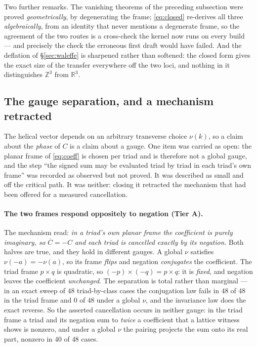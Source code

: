 \documentclass[11pt,a4paper]{article}
\newcommand{\tA}{\textcolor{TierA}{\textbf{Tier A}}}
\newcommand{\Z}{\mathbb{Z}}
\newcommand{\R}{\mathbb{R}}
\theoremstyle{definition}
\theoremstyle{plain}
\begin{document}
Two further remarks. The vanishing theorems of the preceding subsection were proved
\emph{geometrically}, by degenerating the frame; \eqref{eq:closed} re-derives all three
\emph{algebraically}, from an identity that never mentions a degenerate frame, so the agreement of
the two routes is a cross-check the kernel now runs on every build --- and precisely the check the
erroneous first draft would have failed. And the deflation of \S\ref{sec:waleffe} is sharpened
rather than softened: the closed form gives the exact size of the transfer everywhere off the two
loci, and nothing in it distinguishes $\Z^3$ from $\R^3$.

\subsection{The gauge separation, and a mechanism retracted}
\label{sec:gauge}

The helical vector depends on an arbitrary transverse choice $\nu(k)$, so a claim about the
\emph{phase} of $C$ is a claim about a gauge. One item was carried as open: the planar frame of
\eqref{eq:coeff} is chosen per triad and is therefore not a global gauge, and the step ``the signed
sum may be evaluated triad by triad in each triad's own frame'' was recorded as observed but not
proved. It was described as small and off the critical path. It was neither: closing it retracted
the mechanism that had been offered for a measured cancellation.

\paragraph{The two frames respond oppositely to negation (\tA{}).}
The mechanism read: \emph{in a triad's own planar frame the coefficient is purely imaginary, so
$\overline C=-C$ and each triad is cancelled exactly by its negation.} Both halves are true, and
they hold in different gauges. A global $\nu$ satisfies $\nu(-a)=-\nu(a)$, so its frame
\emph{flips} and negation \emph{conjugates} the coefficient. The triad frame $p\times q$ is
quadratic, so $(-p)\times(-q)=p\times q$: it is \emph{fixed}, and negation leaves the coefficient
\emph{unchanged}. The separation is total rather than marginal --- in an exact sweep of $48$
triad-by-class cases the conjugation law fails in $48$ of $48$ in the triad frame and $0$ of $48$
under a global $\nu$, and the invariance law does the exact reverse. So the asserted cancellation
occurs in neither gauge: in the triad frame a triad and its negation sum to \emph{twice} a
coefficient that a lattice witness shows is nonzero, and under a global $\nu$ the pairing projects
the sum onto its real part, nonzero in $40$ of $48$ cases.
\end{document}
